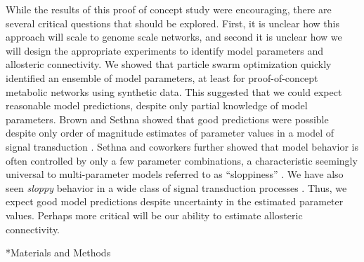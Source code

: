 \documentclass[12pt]{article}
\makeatletter
\renewcommand\section{\@startsection
	{subsection}{2}{0mm}
	{-0.2in}
	{0.05\baselineskip}
	{\normalfont\large\bfseries}}
\makeatother
\begin{document}
While the results of this proof of concept study were encouraging, there are several critical questions that should be explored.
First, it is unclear how this approach will scale to genome scale networks, and second it is unclear how we will design the appropriate experiments 
to identify model parameters and allosteric connectivity. 
We showed that particle swarm optimization quickly identified an ensemble of model parameters, at least for proof-of-concept metabolic networks using synthetic data.
This suggested that we could expect reasonable model predictions, despite only partial knowledge of model parameters. 
Brown and Sethna showed that good predictions were possible despite only order of magnitude estimates of parameter values in a model of signal transduction \citep{Brown:2003aa}.
Sethna and coworkers further showed that model behavior is often controlled by only a few parameter combinations, 
a characteristic seemingly universal to multi-parameter models referred to as ``sloppiness'' \citep{Machta:2013aa}.
We have also seen \textit{sloppy} behavior in a wide class of signal transduction processes \citep{Luan:2007aa,Song:2009aa,Tasseff:2010aa,Tasseff:2011aa,Nayak:2011aa,Lequieu:2011aa}.
Thus, we expect good model predictions despite uncertainty in the estimated parameter values.
Perhaps more critical will be our ability to estimate allosteric connectivity.



\clearpage

\section*{Materials and Methods}
\end{document}
